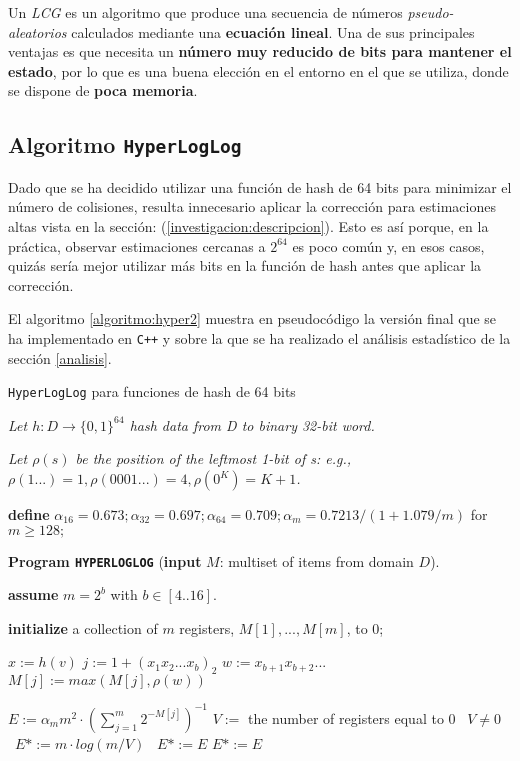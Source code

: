 Un \emph{LCG} es un algoritmo que produce una secuencia de números \emph{pseudo-aleatorios} calculados mediante una
\textbf{ecuación lineal}. Una de sus principales ventajas es que necesita un \textbf{número muy reducido de bits para mantener el
estado}, por lo que es una buena elección en el entorno en el que se utiliza, donde se dispone de \textbf{poca memoria}.

\subsection{Algoritmo \texttt{HyperLogLog}}
\label{implementacion:algoritmo}

Dado que se ha decidido utilizar una función de hash de 64 bits para minimizar el número de colisiones, resulta innecesario aplicar la
corrección para estimaciones altas vista en la sección:  (\ref{investigacion:descripcion}). Esto es así
porque, en la práctica, observar estimaciones cercanas a $2^{64}$ es poco común y, en esos casos, quizás sería mejor utilizar más bits
en la función de hash antes que aplicar la corrección.

El algoritmo \ref{algoritmo:hyper2} muestra en pseudocódigo la versión final que se ha implementado en \texttt{C++} y sobre la que
se ha realizado el análisis estadístico de la sección \ref{analisis}.

\begin{algorithm}[h!]
\caption{\texttt{HyperLogLog} para funciones de hash de 64 bits}
\label{algoritmo:hyper2}
\textit{Let $h: D\rightarrow \{0,1\}^{64}$ hash data from D to binary 32-bit word.}

\textit{Let $\rho(s)$ be the position of the leftmost 1-bit of s: e.g.,
$\rho(1...) = 1, \rho(0001...) = 4, \rho(0^K) = K + 1$.}

\textbf{define} $\alpha_{16}=0.673;\alpha_{32}=0.697;\alpha_{64}=0.709;\alpha_m=0.7213/(1+1.079/m)$
for $m \geq 128;$

\textbf{Program \texttt{HYPERLOGLOG}} (\textbf{input} $M$: multiset of items from domain $D$).

\textbf{assume} $m=2^b$ with $ b\in[4..16]$.

\textbf{initialize} a collection of $m$ registers, $M[1],...,M[m]$, to 0;

\begin{algorithmic}
            \STATE $x  := h(v)$
            \STATE $j   := 1 + (x_1 x_2 ... x_b)_2$ 
            \STATE $w := x_{b+1} x_{b+2} ... $
            \STATE $M[j] := max(M[j],\rho(w))$
    \ENDFOR

    \STATE $E:=\alpha _m m^2·\left(\sum\limits_{j=1}^m 2^{-M[j]}\right)^{-1}$ 
        \STATE $V :=$ the number of registers equal to $0$
        \STATE \algorithmicif\ $V \neq 0$ \algorithmicthen\ $E* := m \cdot log(m / V)$ \algorithmicelse\ $E* := E$
    \ELSE
        \STATE $E*:=E$
    \ENDIF
\end{algorithmic}
\end{algorithm}

\newpage